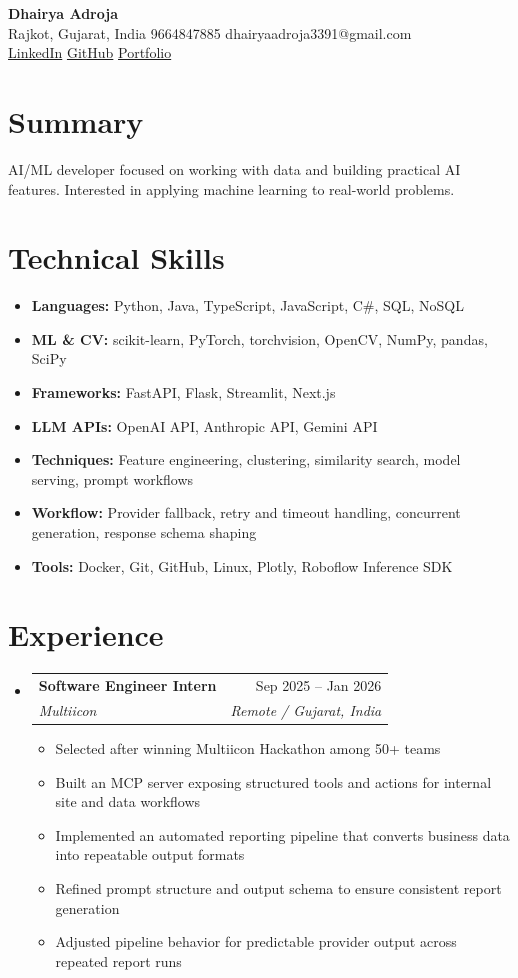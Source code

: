 \documentclass[11pt,a4paper]{article}
\makeatletter
\newcommand{\resumeSubheading}[4]{
  \vspace{-1pt}\item
    \begin{tabular*}{0.97\textwidth}[t]{l@{\extracolsep{\fill}}r}
      \textbf{#1} & #2 \\
      \textit{#3} & \textit{#4} \\
    \end{tabular*}\vspace{-3pt}
}
\newcommand{\resumeItem}[1]{
  \item\small{#1 \vspace{-1pt}}
}
\makeatother
\begin{document}
\begin{center}
    {\huge \textbf{Dhairya Adroja}} \\
    \vspace{8pt}
    \small Rajkot, Gujarat, India \textbar{} 9664847885 \textbar{} dhairyaadroja3391@gmail.com \\
    \small
    \href{https://www.linkedin.com/in/adrojadhairya}{LinkedIn} \textbar{}
    \href{https://www.github.com/Dhairya3391}{GitHub} \textbar{}
    \href{https://dhairya.codes}{Portfolio}
\end{center}

\section{Summary}
\noindent AI/ML developer focused on working with data and building practical AI features. Interested in applying machine learning to real-world problems.

\section{Technical Skills}
\begin{itemize}[leftmargin=*]
  \resumeItem{\textbf{Languages:} Python, Java, TypeScript, JavaScript, C\#, SQL, NoSQL}
  \resumeItem{\textbf{ML \& CV:} scikit-learn, PyTorch, torchvision, OpenCV, NumPy, pandas, SciPy}
  \resumeItem{\textbf{Frameworks:} FastAPI, Flask, Streamlit, Next.js}
  \resumeItem{\textbf{LLM APIs:} OpenAI API, Anthropic API, Gemini API}
  \resumeItem{\textbf{Techniques:} Feature engineering, clustering, similarity search, model serving, prompt workflows}
  \resumeItem{\textbf{Workflow:} Provider fallback, retry and timeout handling, concurrent generation, response schema shaping}
  \resumeItem{\textbf{Tools:} Docker, Git, GitHub, Linux, Plotly, Roboflow Inference SDK}
\end{itemize}

\section{Experience}
\begin{itemize}[leftmargin=*]

\resumeSubheading
{Software Engineer Intern}{Sep 2025 -- Jan 2026}
{Multiicon}{Remote / Gujarat, India}
\begin{itemize}[leftmargin=*]
  \resumeItem{Selected after winning Multiicon Hackathon among 50+ teams}
  \resumeItem{Built an MCP server exposing structured tools and actions for internal site and data workflows}
  \resumeItem{Implemented an automated reporting pipeline that converts business data into repeatable output formats}
  \resumeItem{Refined prompt structure and output schema to ensure consistent report generation}
  \resumeItem{Adjusted pipeline behavior for predictable provider output across repeated report runs}
\end{itemize}

\end{itemize}
\end{document}
